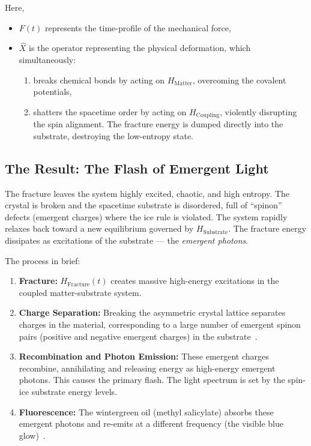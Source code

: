 \documentclass[12pt, a4paper]{article}
\begin{document}
Here,
\begin{itemize}
    \item $F(t)$ represents the time-profile of the mechanical force,
    \item $\hat{X}$ is the operator representing the physical deformation, which simultaneously:
    \begin{enumerate}
        \item breaks chemical bonds by acting on $H_{\mathrm{Matter}}$, overcoming the covalent potentials,
        \item shatters the spacetime order by acting on $H_{\mathrm{Coupling}}$, violently disrupting the spin alignment. The fracture energy is dumped directly into the substrate, destroying the low-entropy state.
    \end{enumerate}
\end{itemize}

\subsection*{The Result: The Flash of Emergent Light}

The fracture leaves the system highly excited, chaotic, and high entropy. The crystal is broken and the spacetime substrate is disordered, full of “spinon” defects (emergent charges) where the ice rule is violated. The system rapidly relaxes back toward a new equilibrium governed by $H_{\mathrm{Substrate}}$. The fracture energy dissipates as excitations of the substrate — the \emph{emergent photons}.

The process in brief:

\begin{enumerate}
    \item \textbf{Fracture:} $H_{\mathrm{Fracture}}(t)$ creates massive high-energy excitations in the coupled matter-substrate system.
    \item \textbf{Charge Separation:} Breaking the asymmetric crystal lattice separates charges in the material, corresponding to a large number of emergent spinon pairs (positive and negative emergent charges) in the substrate~\cite{ref7,ref8}.
    \item \textbf{Recombination and Photon Emission:} These emergent charges recombine, annihilating and releasing energy as high-energy emergent photons. This causes the primary flash. The light spectrum is set by the spin-ice substrate energy levels.
    \item \textbf{Fluorescence:} The wintergreen oil (methyl salicylate) absorbs these emergent photons and re-emits at a different frequency (the visible blue glow)~\cite{ref8}.
\end{enumerate}
\end{document}
